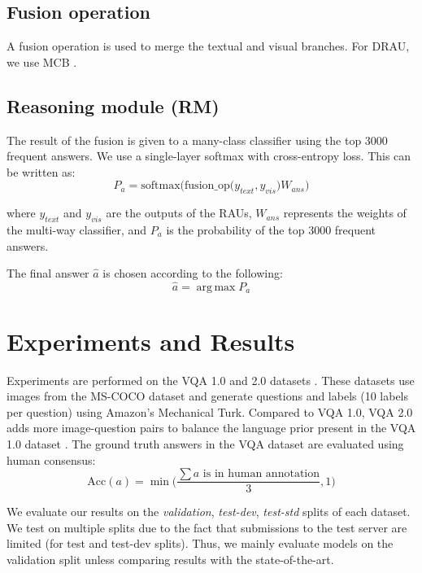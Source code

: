 \documentclass[times,twocolumn, final ,authoryear]{elsarticle}
\DeclareMathOperator*{\argmax}{arg\,max}
\begin{document}
\subsection{Fusion operation}
A fusion operation is used to merge the textual and visual branches. For DRAU, we use MCB \citep{fukui2016, gao2016}.

\subsection{Reasoning module (RM)}
The result of the fusion is given to a many-class classifier using the top 3000 frequent answers. We use a single-layer softmax with cross-entropy loss. This can be written as:
\begin{equation}
P_a = \mathrm{softmax}\Big(\mathrm{fusion\_op}\big(y_{text}, y_{vis}\big) W_{ans} \Big)
\end{equation}

where $y_{text}$ and $y_{vis}$ are the outputs of the RAUs, $W_{ans}$ represents the weights of the multi-way classifier, and $P_a$ is the probability of the top 3000 frequent answers.

The final answer $\hat{a}$ is chosen according to the following:
\begin{equation} \hat{a} = \argmax P_a \end{equation}

\section{Experiments and Results}\label{sec:experiments}
Experiments are performed on the VQA 1.0 and 2.0 datasets \citep{goyal2016,antol2015}. These datasets use images from the MS-COCO dataset \citep{lin2014} and generate questions and labels (10 labels per question) using Amazon's Mechanical Turk. Compared to VQA 1.0, VQA 2.0 adds more image-question pairs to balance the language prior present in the VQA 1.0 dataset \citep{goyal2016}. The ground truth answers in the VQA dataset are evaluated using human consensus:
\begin{equation}
\mathrm{Acc}(a) = \min \bigg(\frac{\sum{a \text{ is in human annotation} }}{3}, 1\bigg)
\end{equation}

We evaluate our results on the \textit{validation}, \textit{test-dev}, \textit{test-std} splits of each dataset. We test on multiple splits due to the fact that submissions to the test server are limited (for test and test-dev splits). Thus, we mainly evaluate models on the validation split unless comparing results with the state-of-the-art.
\end{document}
